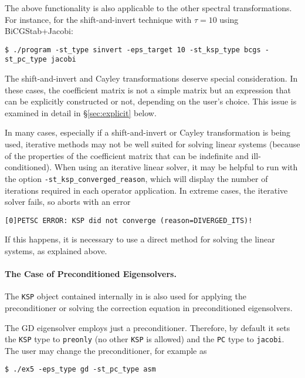 	The above functionality is also applicable to the other spectral transformations. For instance, for the shift-and-invert technique with $\tau=10$ using BiCGStab+Jacobi:
\begin{Verbatim}[fontsize=\small]
	$ ./program -st_type sinvert -eps_target 10 -st_ksp_type bcgs -st_pc_type jacobi
\end{Verbatim}
	The shift-and-invert and Cayley transformations deserve special consideration. In these cases, the coefficient matrix is not a simple matrix but an expression that can be explicitly constructed or not, depending on the user's choice. This issue is examined in detail in \S\ref{sec:explicit} below.

In many cases, especially if a shift-and-invert or Cayley transformation is being used, iterative methods may not be well suited for solving linear systems (because of the properties of the coefficient matrix that can be indefinite and ill-conditioned). When using an iterative linear solver, it may be helpful to run with the option \Verb!-st_ksp_converged_reason!, which will display the number of iterations required in each operator application.
In extreme cases, the iterative solver fails, so  aborts with an error
\begin{Verbatim}[fontsize=\small]
	[0]PETSC ERROR: KSP did not converge (reason=DIVERGED_ITS)!
\end{Verbatim}
If this happens, it is necessary to use a direct method for solving the linear systems, as explained above.

\paragraph{The Case of Preconditioned Eigensolvers.}

	The \texttt{KSP} object contained internally in  is also used for applying the preconditioner or solving the correction equation in preconditioned eigensolvers.

	The GD eigensolver employs just a preconditioner. Therefore, by default it sets the \texttt{KSP} type to \texttt{preonly} (no other \texttt{KSP} is allowed) and the \texttt{PC} type to \texttt{jacobi}. The user may change the preconditioner, for example as
\begin{Verbatim}[fontsize=\small]
	$ ./ex5 -eps_type gd -st_pc_type asm
\end{Verbatim}

